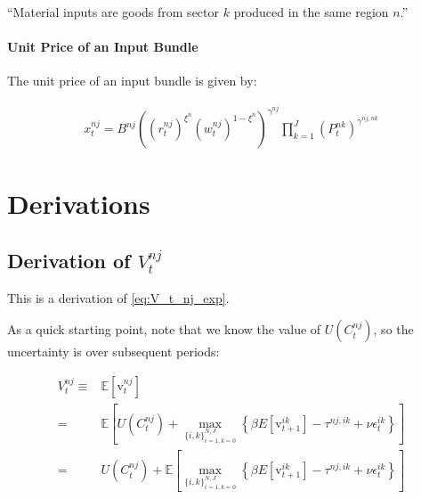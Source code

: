 \documentclass[10pt]{article}
\begin{document}
``Material inputs are goods from sector $k$
produced in the same region $n$.''

\paragraph{Unit Price of an Input Bundle}

The unit price of an input bundle is given by:

\begin{align}
    x_t^{n j}=B^{n j}\left(\left(r_t^{n j}\right)^{\xi^n}\left(w_t^{n j}\right)^{1-\xi^n}\right)^{\gamma^{n j}} \prod_{k=1}^J\left(P_t^{n k}\right)^{\gamma^{n j, n k}}
\end{align}



\section{Derivations}


\subsection{Derivation of $V_t^{n j}$}
\label{sec:V_t_nj_exp}

This is a derivation of \autoref{eq:V_t_nj_exp}.

As a quick starting point, note that we know the 
value of $U\left(C_t^{n j}\right)$, so 
the uncertainty is over subsequent periods:

\begin{align}
    V_t^{n j} \equiv &\mathbb{E}\left[\mathrm{v}_t^{n j}\right] \\
    = &\mathbb{E}\left[U\left(C_t^{n j}\right)+\max _{\{i, k\}_{i=1, k=0}^{N, J}}\left\{\beta E\left[\mathrm{v}_{t+1}^{i k}\right]-\tau^{n j, i k}+\nu \epsilon_t^{i k}\right\}\right] \\
    = &U\left(C_t^{n j}\right)+ \mathbb{E}\left[\max _{\{i, k\}_{i=1, k=0}^{N, J}}\left\{\beta E\left[\mathrm{v}_{t+1}^{i k}\right]-\tau^{n j, i k}+\nu \epsilon_t^{i k}\right\}\right]
\end{align}
\end{document}
